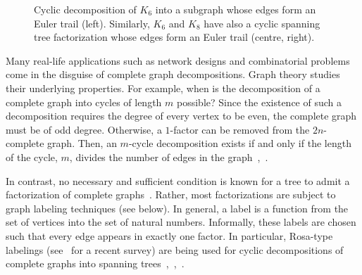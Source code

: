 \documentclass{article}
\begin{document}
\begin{figure}[t]
\caption{Cyclic decomposition of $K_6$ into a subgraph whose edges form an Euler trail (left). Similarly, $K_6$ and $K_8$ have also a cyclic spanning tree factorization whose edges form an Euler trail (centre, right).}
\label{fig:cyclic-decomposition}
\end{figure}

Many real-life applications such as network designs and combinatorial problems come in the disguise of complete graph decompositions. Graph theory studies their underlying properties. For example, when is the decomposition of a complete graph into cycles of length $m$ possible? Since the existence of such a decomposition requires the degree of every vertex to be even, the complete graph must be of odd degree. Otherwise, a $1$-factor can be removed from the $2n$-complete graph. Then, an $m$-cycle decomposition exists if and only if the length of the cycle, $m$, divides the number of edges in the graph~\cite{A01},~\cite{S02a}.

In contrast, no necessary and sufficient condition is known for a tree to admit a factorization of complete graphs~\cite{K11}. Rather, most factorizations are subject to graph labeling techniques (see below). In general, a label is a function from the set of vertices into the set of natural numbers. Informally, these labels are chosen such that every edge appears in exactly one factor. In particular, Rosa-type labelings (see~\cite{E09} for a recent survey) are being used for cyclic decompositions of complete graphs into spanning trees~\cite{E97},~\cite{F02},~\cite{F04}.
\end{document}
